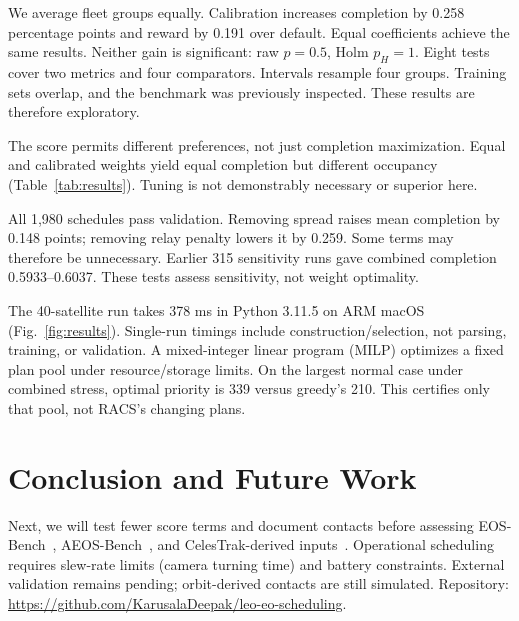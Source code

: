 \documentclass[conference]{IEEEtran}
\begin{document}
We average fleet groups equally. Calibration increases completion by 0.258 percentage points and reward by 0.191 over default. Equal coefficients achieve the same results. Neither gain is significant: raw $p=0.5$, Holm $p_H=1$. Eight tests cover two metrics and four comparators. Intervals resample four groups. Training sets overlap, and the benchmark was previously inspected. These results are therefore exploratory.

The score permits different preferences, not just completion maximization. Equal and calibrated weights yield equal completion but different occupancy (Table~\ref{tab:results}). Tuning is not demonstrably necessary or superior here.

All 1,980 schedules pass validation. Removing spread raises mean completion by 0.148 points; removing relay penalty lowers it by 0.259. Some terms may therefore be unnecessary. Earlier 315 sensitivity runs gave combined completion 0.5933--0.6037. These tests assess sensitivity, not weight optimality.

The 40-satellite run takes 378 ms in Python 3.11.5 on ARM macOS (Fig.~\ref{fig:results}). Single-run timings include construction/selection, not parsing, training, or validation. A mixed-integer linear program (MILP) optimizes a fixed plan pool under resource/storage limits. On the largest normal case under combined stress, optimal priority is 339 versus greedy's 210. This certifies only that pool, not RACS's changing plans.

\section{Conclusion and Future Work}
Next, we will test fewer score terms and document contacts before assessing EOS-Bench~\cite{eosbench}, AEOS-Bench~\cite{aeosbench}, and CelesTrak-derived inputs~\cite{celestrak}. Operational scheduling requires slew-rate limits (camera turning time) and battery constraints. External validation remains pending; orbit-derived contacts are still simulated. Repository: \url{https://github.com/KarusalaDeepak/leo-eo-scheduling}.
\end{document}
